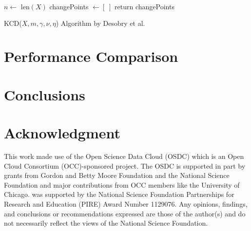 \documentclass[conference,letterpaper]{IEEEtran}
\begin{document}
\begin{function}
	\SetAlgoLined
	$n \gets$ len$(X)$ \;
	\BlankLine
	changePoints $\gets [ \; ]$ \;
	\BlankLine
	return changePoints
 \caption{KCD($X, m, \gamma, \nu, \eta$) Algorithm by Desobry et al.\cite{1468491}}
\end{function}

\section{Performance Comparison}


\section{Conclusions}



\section*{Acknowledgment}
This work made use of the Open Science Data Cloud (OSDC) which is an Open
Cloud Consortium (OCC)-sponsored project. The OSDC is supported in part by
grants from Gordon and Betty Moore Foundation and the National Science 
Foundation and major contributions from OCC members like the University of 
Chicago.   was supported by the 
National Science Foundation Partnerships for Research and Education (PIRE) 
Award Number 1129076. Any opinions, findings, and conclusions or 
recommendations expressed are those of the author(s) and do not necessarily 
reflect the views of the National Science Foundation. 
\end{document}
